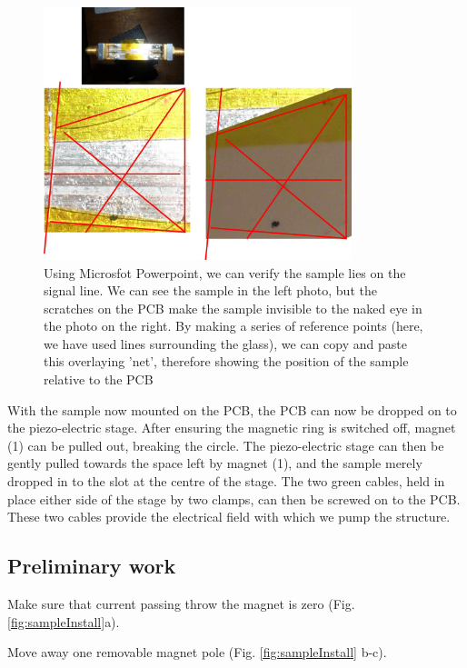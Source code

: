 \documentclass[14pt,a4paper] {article}
\begin{document}
\begin{figure}[pH]
\includegraphics[width=0.8\textwidth]{PCB-Signal-line-Sample-Verification.jpg}

\caption{Using Microsfot Powerpoint, we can verify the sample lies on the signal line. We can see the sample in the left photo, but the scratches on the PCB make the sample invisible to the naked eye in the photo on the right. By making a series of reference points (here, we have used lines surrounding the glass), we can copy and paste this overlaying 'net', therefore showing the position of the sample relative to the PCB}
\label{fig:fixSample}
\end{figure}


With the sample now mounted on the PCB, the PCB can now be dropped on to the piezo-electric stage. After ensuring the magnetic ring is switched off, magnet (1) can be pulled out, breaking the circle. The piezo-electric stage can then be gently pulled towards the space left by magnet (1), and the sample merely dropped in to the slot at the centre of the stage. The two green cables, held in place either side of the stage by two clamps, can then be screwed on to the PCB. These two cables provide the electrical field with which we pump the structure.

\newpage

\subsection{Preliminary work}


Make sure that current passing throw the magnet is zero (Fig. \ref{fig:sampleInstall}a).

Move away one removable magnet pole (Fig. \ref{fig:sampleInstall} b-c).
\end{document}
